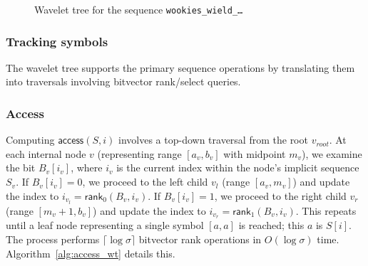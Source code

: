 \begin{figure}[h]
    \caption{\small Wavelet tree for the sequence \texttt{wookies\_wield\_\dots}} \label{fig:wavelet_tree_example}
\end{figure}

\subsubsection*{Tracking symbols}
The wavelet tree supports the primary sequence operations by translating them into traversals involving bitvector rank/select queries.

\subsubsection{Access}
Computing $\textsf{access}(S, i)$ involves a top-down traversal from the root $v_{root}$. At each internal node $v$ (representing range $[a_v, b_v]$ with midpoint $m_v$), we examine the bit $B_v[i_v]$, where $i_v$ is the current index within the node's implicit sequence $S_v$. If $B_v[i_v] = 0$, we proceed to the left child $v_l$ (range $[a_v, m_v]$) and update the index to $i_{v_l} = \textsf{rank}_0(B_v, i_v)$. If $B_v[i_v] = 1$, we proceed to the right child $v_r$ (range $[m_v+1, b_v]$) and update the index to $i_{v_r} = \textsf{rank}_1(B_v, i_v)$. This repeats until a leaf node representing a single symbol $[a, a]$ is reached; this $a$ is $S[i]$. The process performs $\lceil \log \sigma \rceil$ bitvector \textsf{rank} operations in $O(\log \sigma)$ time. Algorithm~\ref{alg:access_wt} details this.

